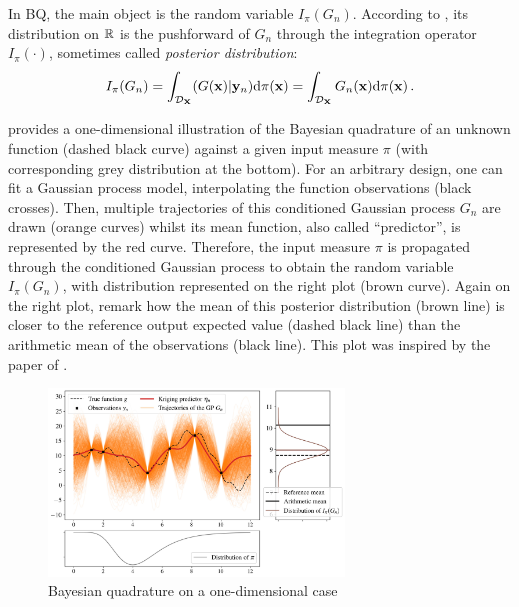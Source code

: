 In BQ, the main object is the random variable $I_{\pi}(G_n)$. 
According to \cite{briol_oates_2019}, its distribution on $\mathbb{R}$ is the pushforward of $G_n$ through the integration operator $I_\pi(\cdot)$, sometimes called \emph{posterior distribution}: 
\begin{equation}
    I_{\pi}(G_n) = \int_{\mathcal{D}_{\bf X}} (G({\bf x}) | {\bf y}_n)  \mathrm{d} \pi({\bf x}) = \int_{\mathcal{D}_{\bf X}} G_n({\bf x})  \mathrm{d} \pi({\bf x}) \,.
\label{eq:posterior}
\end{equation}

 provides a one-dimensional illustration of the Bayesian quadrature of an unknown function (dashed black curve) against a given input measure $\pi$ (with corresponding grey distribution at the bottom). 
For an arbitrary design, one can fit a Gaussian process model, interpolating the function observations (black crosses). 
Then, multiple trajectories of this conditioned Gaussian process $G_n$ are drawn (orange curves) whilst its mean function, also called ``predictor'', is represented by the red curve. 
Therefore, the input measure $\pi$ is propagated through the conditioned Gaussian process to obtain the random variable $I_{\pi}(G_n)$, with distribution represented on the right plot (brown curve). 
Again on the right plot, remark how the mean of this posterior distribution (brown line) is closer to the reference output expected value (dashed black line) than the arithmetic mean of the observations (black line). 
This plot was inspired by the paper of \cite{husar_duvenaud_2012}.

\begin{figure}[!h]
\begin{center}
    \includegraphics[width=0.7\textwidth]{part2/figures/DCE/numerical_experiments/posterior_distribution_centered.jpg}
    \caption{Bayesian quadrature on a one-dimensional case}
    \label{fig:bayesian_quad}
\end{center}
\end{figure}

